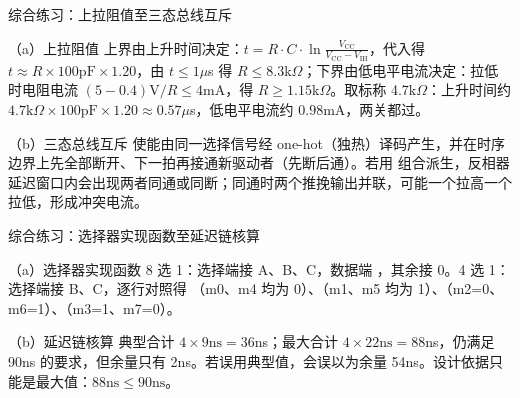 \begin{chapteranswer}{综合练习：上拉阻值至三态总线互斥}
\begin{answersubproblem}{（a）上拉阻值}
上界由上升时间决定：$t=R\cdot C\cdot\ln\frac{V_\mathrm{CC}}{V_\mathrm{CC}-V_\mathrm{IH}}$，代入得 $t\approx R\times100\mathrm{pF}\times1.20$，由 $t\le1\mu$s 得 $R\le8.3$k$\Omega$；下界由低电平电流决定：拉低时电阻电流 $(5-0.4)\mathrm{V}/R\le4$mA，得 $R\ge1.15$k$\Omega$。取标称 4.7k$\Omega$：上升时间约 $4.7\mathrm{k}\Omega\times100\mathrm{pF}\times1.20\approx0.57\mu$s，低电平电流约 $0.98$mA，两关都过。
\end{answersubproblem}
\begin{answersubproblem}{（b）三态总线互斥}
使能由同一选择信号经 one-hot（独热）译码产生，并在时序边界上先全部断开、下一拍再接通新驱动者（先断后通）。若用  组合派生，反相器延迟窗口内会出现两者同通或同断；同通时两个推挽输出并联，可能一个拉高一个拉低，形成冲突电流。
\end{answersubproblem}
\end{chapteranswer}

\begin{chapteranswer}{综合练习：选择器实现函数至延迟链核算}
\begin{answersubproblem}{（a）选择器实现函数}
8 选 1：选择端接 A、B、C，数据端 ，其余接 0。4 选 1：选择端接 B、C，逐行对照得 （m0、m4 均为 0）、（m1、m5 均为 1）、（m2=0、m6=1）、（m3=1、m7=0）。
\end{answersubproblem}
\begin{answersubproblem}{（b）延迟链核算}
典型合计 $4\times9\mathrm{ns}=36$ns；最大合计 $4\times22\mathrm{ns}=88$ns，仍满足 90ns 的要求，但余量只有 2ns。若误用典型值，会误以为余量 54ns。设计依据只能是最大值：$88\mathrm{ns}\le90\mathrm{ns}$。
\end{answersubproblem}
\end{chapteranswer}

